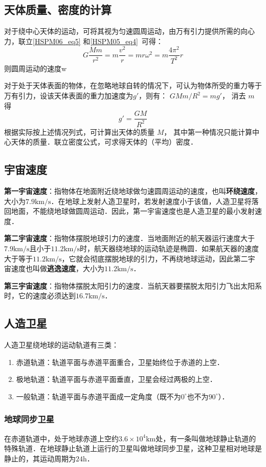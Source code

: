 \subsection{天体质量、密度的计算}

对于绕中心天体的运动，可将其视为匀速圆周运动，由万有引力提供所需的向心力，联立\autoref{HSPM06_eq5} 和\autoref{HSPM05_eq4}~可得：
\begin{equation}
G\frac{Mm}{r^2}=m\frac{v^2}{r}=mr\omega^2=m\frac{4\pi^2}{T^2}r
\end{equation}
则圆周运动的速度w

对于处于天体表面的物体，在忽略地球自转的情况下，可认为物体所受的重力等于万有引力，设该天体表面的重力加速度为$g'$，则有： $GMm/R^2=mg'$， 消去 $m$ 得
\begin{equation}
g' = \frac{GM}{R^2}
\end{equation}
根据实际按上述情况列式，可计算出天体的质量 $M$， 其中第一种情况只能计算中心天体的质量．联立密度公式，可求得天体的（平均）密度．

\subsection{宇宙速度}

\textbf{第一宇宙速度}：指物体在地面附近绕地球做匀速圆周运动的速度，也叫\textbf{环绕速度}，大小为$7.9\mathrm{km/s}$．在地球上发射人造卫星时，若发射速度小于该值，人造卫星将落回地面，不能绕地球做圆周运动．因此，第一宇宙速度也是人造卫星的最小发射速度．

\textbf{第二宇宙速度}：指物体摆脱地球引力的速度．当地面附近的航天器运行速度大于$7.9\mathrm{km/s}$且小于$11.2\mathrm{km/s}$时，航天器绕地球的运动轨迹是椭圆．如果航天器的速度大于等于$11.2\mathrm{km/s}$，它就会彻底摆脱地球的引力，不再绕地球运动，因此第二宇宙速度也叫做\textbf{逃逸速度}，大小为$11.2\mathrm{km/s}$．

\textbf{第三宇宙速度}：指物体摆脱太阳引力的速度．当航天器要摆脱太阳引力飞出太阳系时，它的速度必须达到$16.7\mathrm{km/s}$．

\subsection{人造卫星}

人造卫星绕地球的运动轨道有三类：

\begin{enumerate}
\item 赤道轨道：轨道平面与赤道平面重合，卫星始终位于赤道的上空．
\item 极地轨道：轨道平面与赤道平面垂直，卫星会经过两极的上空．
\item 一般轨道：轨道平面与赤道平面成一定角度（既不为$0^\circ$也不为$90^\circ$）．
\end{enumerate}

\subsubsection{地球同步卫星}

在赤道轨道中，处于地球赤道上空约$3.6\times10^4\mathrm{km}$处，有一条叫做地球静止轨道的特殊轨道．在地球静止轨道上运行的卫星叫做地球同步卫星，这种卫星相对地球是静止的，其运动周期为$24\mathrm{h}$．
